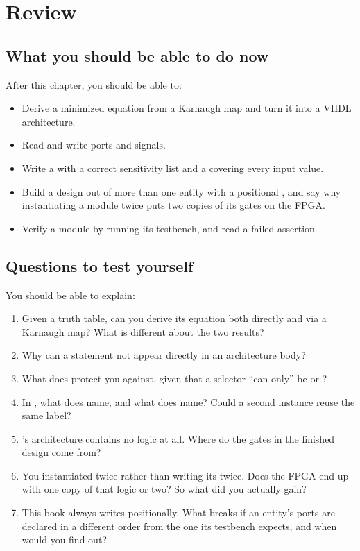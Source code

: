 
\section{Review}
\label{c2:sec:review}

\subsection*{What you should be able to do now}
After this chapter, you should be able to:
\begin{itemize}
  \item Derive a minimized equation from a Karnaugh map and turn it into a VHDL architecture.
  \item Read and write  ports and signals.
  \item Write a  with a correct sensitivity list and a  covering every input
    value.
  \item Build a design out of more than one entity with a positional , and say why
    instantiating a module twice puts two copies of its gates on the FPGA.
  \item Verify a module by running its testbench, and read a failed assertion.
\end{itemize}

\subsection*{Questions to test yourself}
You should be able to explain:
\begin{enumerate}
  \item Given a truth table, can you derive its equation both directly and via a Karnaugh map? What
    is different about the two results?
  \item Why can a  statement not appear directly in an architecture body?
  \item What does  protect you against, given that a selector ``can only'' be
     or ?
  \item In , what does  name, and what does
     name? Could a second instance reuse the same label?
  \item {}'s architecture contains no logic at all. Where do the gates in the finished
    design come from?
  \item You instantiated  twice rather than writing its  twice. Does the FPGA
    end up with one copy of that logic or two? So what did you actually gain?
  \item This book always writes  positionally. What breaks if an entity's ports are
    declared in a different order from the one its testbench expects, and when would you find out?
\end{enumerate}

